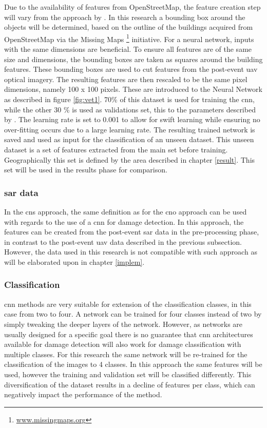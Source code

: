 \noindent Due to the availability of features from OpenStreetMap, the feature creation step will vary from the approach by \citet{Vetrivel2016b}. In this research a bounding box around the objects will be determined, based on the outline of the buildings acquired from OpenStreetMap via the Missing Maps \footnote{\url{www.missingmaps.org}} initiative. For a neural network, inputs with the same dimensions are beneficial. To ensure all features are of the same size and dimensions, the bounding boxes are taken as squares around the building features. These bounding boxes are used to cut features from the post-event \ac{uav} optical imagery. The resulting features are then rescaled to be the same pixel dimensions, namely 100 x 100 pixels. These are introduced to the Neural Network as described in figure \ref{fig:vet1}. 70\% of this dataset is used for training the \ac{cnn}, while the other 30 \% is used as validations set, this to the parameters described by \citet{Vetrivel2016b}. The learning rate is set to 0.001 to allow for swift learning while ensuring no over-fitting occurs due to a large learning rate. The resulting trained network is saved and used as input for the classification of an unseen dataset. This unseen dataset is a set of features extracted from the main set before training. Geographically this set is defined by the area described in chapter \ref{result}. This set will be used in the results phase for comparison. 

\subsubsection*{\ac{sar} data}
In the \ac{cns} approach, the same definition as for the \ac{cno} approach can be used with regards to the use of a \ac{cnn} for damage detection. In this approach, the features can be created from the post-event \ac{sar} data in the pre-processing phase, in contrast to the post-event \ac{uav} data described in the previous subsection. However, the data used in this research is not compatible with such approach as will be elaborated upon in chapter \ref{implem}.

\subsubsection*{Classification}
\ac{cnn} methods are very suitable for extension of the classification classes, in this case from two to four. A network can be trained for four classes instead of two by simply tweaking the deeper layers of the network. However, as networks are usually designed for a specific goal there is no guarantee that \ac{cnn} architectures available for damage detection will also work for damage classification with multiple classes. For this research the same network will be re-trained for the classification of the images to 4 classes. In this approach the same features will be used, however the training and validation set will be classified differently. This diversification of the dataset results in a decline of features per class, which can negatively impact the performance of the method.

